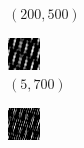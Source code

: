 \documentclass[a4paper, landscape]{article}
\begin{document}
\begin{figure}[H]
\begin{subfigure}{0.12\linewidth}
        \caption{$(200, 500)$}
    \end{subfigure}
    \begin{subfigure}{0.12\linewidth}
        \centering
        \includegraphics[width=\linewidth]{omp/k = 5, m = 700.png}
        \caption{$(5, 700)$}
    \end{subfigure}
    \begin{subfigure}{0.12\linewidth}
        \centering
        \includegraphics[width=\linewidth]{omp/k = 10, m = 700.png}

\end{subfigure}
\end{figure}
\end{document}
